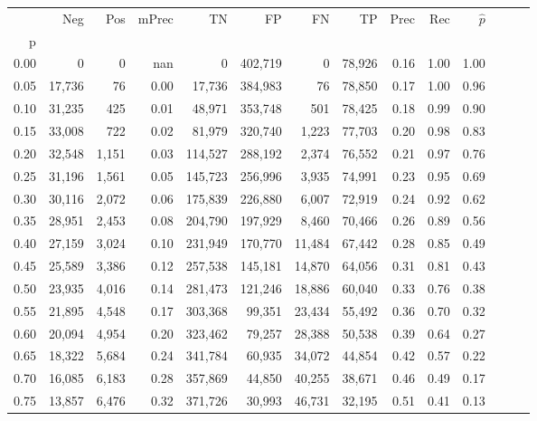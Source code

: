 \begin{tabular}{rrrrrrrrrrrrrr}
\toprule
{} &     Neg &    Pos & mPrec &       TN &       FP &      FN &      TP &  Prec &   Rec & $\hat{p}$ \\
p    &         &        &       &          &          &         &         &       &       &           \\
\midrule
0.00 &       0 &      0 &   nan &        0 &  402,719 &       0 &  78,926 &  0.16 &  1.00 &      1.00 \\
0.05 &  17,736 &     76 &  0.00 &   17,736 &  384,983 &      76 &  78,850 &  0.17 &  1.00 &      0.96 \\
0.10 &  31,235 &    425 &  0.01 &   48,971 &  353,748 &     501 &  78,425 &  0.18 &  0.99 &      0.90 \\
0.15 &  33,008 &    722 &  0.02 &   81,979 &  320,740 &   1,223 &  77,703 &  0.20 &  0.98 &      0.83 \\
0.20 &  32,548 &  1,151 &  0.03 &  114,527 &  288,192 &   2,374 &  76,552 &  0.21 &  0.97 &      0.76 \\
0.25 &  31,196 &  1,561 &  0.05 &  145,723 &  256,996 &   3,935 &  74,991 &  0.23 &  0.95 &      0.69 \\
0.30 &  30,116 &  2,072 &  0.06 &  175,839 &  226,880 &   6,007 &  72,919 &  0.24 &  0.92 &      0.62 \\
0.35 &  28,951 &  2,453 &  0.08 &  204,790 &  197,929 &   8,460 &  70,466 &  0.26 &  0.89 &      0.56 \\
0.40 &  27,159 &  3,024 &  0.10 &  231,949 &  170,770 &  11,484 &  67,442 &  0.28 &  0.85 &      0.49 \\
0.45 &  25,589 &  3,386 &  0.12 &  257,538 &  145,181 &  14,870 &  64,056 &  0.31 &  0.81 &      0.43 \\
0.50 &  23,935 &  4,016 &  0.14 &  281,473 &  121,246 &  18,886 &  60,040 &  0.33 &  0.76 &      0.38 \\
0.55 &  21,895 &  4,548 &  0.17 &  303,368 &   99,351 &  23,434 &  55,492 &  0.36 &  0.70 &      0.32 \\
0.60 &  20,094 &  4,954 &  0.20 &  323,462 &   79,257 &  28,388 &  50,538 &  0.39 &  0.64 &      0.27 \\
0.65 &  18,322 &  5,684 &  0.24 &  341,784 &   60,935 &  34,072 &  44,854 &  0.42 &  0.57 &      0.22 \\
0.70 &  16,085 &  6,183 &  0.28 &  357,869 &   44,850 &  40,255 &  38,671 &  0.46 &  0.49 &      0.17 \\
0.75 &  13,857 &  6,476 &  0.32 &  371,726 &   30,993 &  46,731 &  32,195 &  0.51 &  0.41 &      0.13 \\

\end{tabular}
